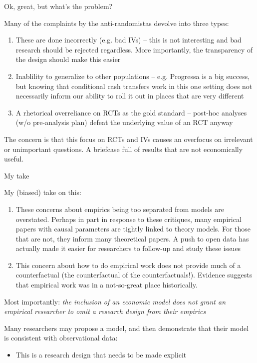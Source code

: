 \documentclass[notes,11pt, aspectratio=169]{beamer}
\newenvironment{wideitemize}{\itemize\addtolength{\itemsep}{10pt}}{\enditemize}
\begin{document}
\begin{frame}{Ok, great, but what's the problem?}
  \begin{wideitemize}
  \item Many of the complaints by the anti-randomistas devolve into three types:
    \begin{enumerate}
    \item These are done incorrectly (e.g. bad IVs) -- this is not interesting and bad research should be rejected regardless. More importantly, the transparency of the design should make this easier
    \item Inablility to generalize to other populations --
      e.g. Progressa is a big success, but knowing that conditional
      cash transfers work in this one setting does not necessarily
      inform our ability to roll it out in places that are very
      different
    \item A rhetorical overreliance on RCTs as the gold standard --
      post-hoc analyses (w/o pre-analysis plan) defeat the underlying
      value of an RCT anyway
    \end{enumerate}
  \item The concern is that this focus on RCTs and IVs causes an
    overfocus on irrelevant or unimportant questions.  A briefcase
    full of results that are not economically useful.
  \end{wideitemize}
\end{frame}


\begin{frame}{My take}
  \begin{wideitemize}
  \item My (biased) take on this:
    \begin{enumerate}
    \item These concerns about empirics being too separated from
      models are overstated. Perhaps in part in response to these
      critiques, many empirical papers with causal parameters are
      tightly linked to theory models. For those that are not, they
      inform many theoretical papers. A push to open data has actually
      made it easier for researchers to follow-up and study these
      issues
    \item This concern about how to do empirical work does not provide
      much of a counterfactual (the counterfactual of the
      counterfactuals!). Evidence suggests that empirical work was in
      a not-so-great place historically.
    \end{enumerate}
  \item Most importantly: \emph{the inclusion of an economic model does not grant an
      empirical researcher to omit a research design from their empirics}
  \item Many researchers may propose a model, and then demonstrate that their
    model is consistent with observational data:
    \begin{itemize}
    \item This is a research design that needs to be made explicit
    \end{itemize}
  \end{wideitemize}
\end{frame}
\end{document}
